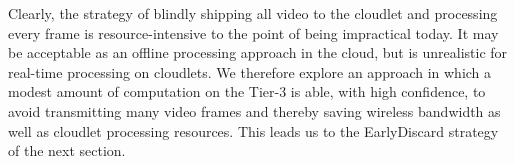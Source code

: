 Clearly, the strategy of blindly shipping all video to the cloudlet and
processing every frame is resource-intensive to the point of being impractical
today.  It may be acceptable as an offline processing approach in the cloud, but
is unrealistic for real-time processing on cloudlets.  We therefore explore an
approach in which a modest amount of computation on the Tier-3 is able, with
high confidence, to avoid transmitting many video frames and thereby saving
wireless bandwidth as well as cloudlet processing resources.  This leads us to
the EarlyDiscard strategy of the next section.



